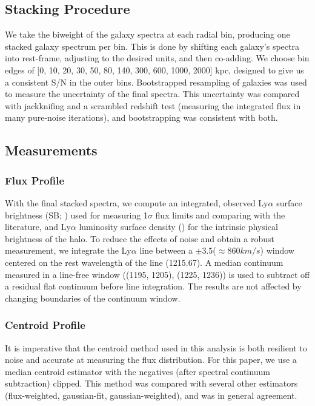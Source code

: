 \documentclass[linenumbers,amsmath,trackchanges,preprint2]{aastex702}
\begin{document}
\subsection{Stacking Procedure}
\par We take the biweight of the galaxy spectra at each radial bin, producing one stacked galaxy spectrum per bin. This is done by shifting each galaxy's spectra into rest-frame, adjusting to the desired units, and then co-adding. We choose bin edges of [0, 10, 20, 30, 50, 80, 140, 300, 600, 1000, 2000] kpc, designed to give us a consistent S/N in the outer bins. Bootstrapped resampling of galaxies was used to measure the uncertainty of the final spectra. This uncertainty was compared with jackknifing and a scrambled redshift test (measuring the integrated flux in many pure-noise iterations), and bootstrapping was consistent with both.

\subsection{Measurements}
\subsubsection{Flux Profile}
\par With the final stacked spectra, we compute an integrated, observed Ly$\alpha$ surface brightness (SB; \Farcsecsq) used for measuring 1$\sigma$ flux limits and comparing with the literature, and Ly$\alpha$ luminosity surface density (\Lkpcsq) for the intrinsic physical brightness of the halo. To reduce the effects of noise and obtain a robust measurement, we integrate the Ly$\alpha$ line between a $\pm3.5$\Ang ($\approx860km/s$) window centered on the rest wavelength of the line (1215.67\Ang). A median continuum measured in a line-free window ((1195, 1205), (1225, 1236)) is used to subtract off a residual flat continuum before line integration. The results are not affected by changing boundaries of the continuum window.

\subsubsection{Centroid Profile}
\par It is imperative that the centroid method used in this analysis is both resilient to noise and accurate at measuring the flux distribution. For this paper, we use a median centroid estimator with the negatives (after spectral continuum subtraction) clipped. This method was compared with several other estimators (flux-weighted, gaussian-fit, gaussian-weighted), and was in general agreement.
\end{document}
